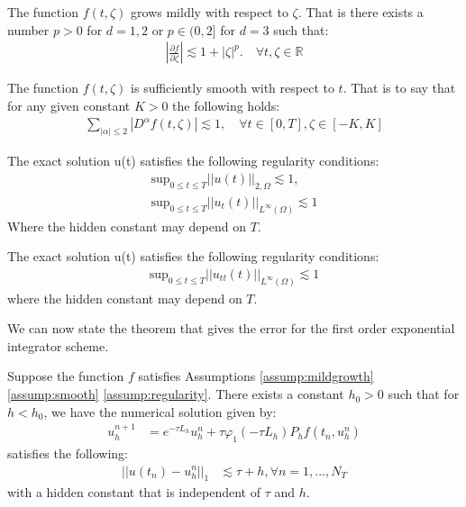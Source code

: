 \begin{assumption}\label{assump:mildgrowth}
    The function $f(t,\zeta)$ grows mildly with respect to $\zeta$.
    That is there exists a number $p>0$ for $d=1,2$ or $p\in(0,2]$ for $d=3$ such that:
    \begin{align*}
        |\frac{\partial f}{\partial \zeta}| \lesssim 1 + |\zeta|^p. \quad \forall t,\zeta \in \mathbb{R}
    \end{align*}
\end{assumption}
\begin{assumption}\label{assump:smooth}
    The function $f(t, \zeta)$ is sufficiently smooth with respect to $t$.
    That is to say that for any given constant $K>0$ the following holds:
    \begin{align*}
        \sum_{|\alpha|\leq2}|D^{\alpha}f(t,\zeta)|\lesssim 1, \quad \forall t\in [0,T], \zeta \in[-K,K]
    \end{align*}
\end{assumption}
\begin{assumption}\label{assump:regularity}
    The exact solution u(t) satisfies the following regularity conditions:
    \begin{align*}
        \text{sup}_{0\leq t \leq T}||u(t)||_{2,\Omega} \lesssim 1,\\
        \text{sup}_{0\leq t \leq T}||u_t(t)||_{L^\infty(\Omega)} \lesssim 1
    \end{align*}
    Where the hidden constant may depend on $T$.
\end{assumption}
\begin{assumption}\label{assump:regularity2}
    The exact solution u(t) satisfies the following regularity conditions:
    \begin{align*}
        \text{sup}_{0\leq t \leq T}||u_{tt}(t)||_{L^\infty(\Omega)} \lesssim 1
    \end{align*}
    where the hidden constant may depend on $T$.
\end{assumption}

We can now state the theorem that gives the error for the first order exponential integrator scheme.
\begin{theorem}\label{theorem:standard1}
    Suppose the function $f$ satisfies Assumptions \ref{assump:mildgrowth} \ref{assump:smooth} \ref{assump:regularity}.
    There exists a constant $h_0 > 0$ such that for $h<h_0$, we have the numerical solution given by:
    \begin{align*}
        u_h^{n+1} &= e^{-\tau L_h}u_h^n + \tau \varphi_1(-\tau L_h)P_hf(t_n,u_h^n)
    \end{align*}
    satisfies the following:
    \begin{align*}
        ||u(t_n) - u_h^n||_1 &\lesssim \tau + h, \forall n =1,...,N_T
    \end{align*}
    with a hidden constant that is independent of $\tau$ and $h$.
\end{theorem}

